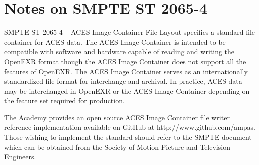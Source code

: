 \numberedformat
\chapter{Notes on SMPTE ST 2065-4}

SMPTE ST 2065-4 -- ACES Image Container File Layout specifies a standard file container for ACES data. The ACES Image Container is intended to be compatible with software and hardware capable of reading and writing the OpenEXR format though the ACES Image Container does not support all the features of OpenEXR. The ACES Image Container serves as an internationally standardized file format for interchange and archival. In practice, ACES data may be interchanged in OpenEXR or the ACES Image Container depending on the feature set required for production.

The Academy provides an open source ACES Image Container file writer reference implementation available on GitHub at http://www.github.com/ampas. Those wishing to implement the standard should refer to the SMPTE document which can be obtained from the Society of Motion Picture and Television Engineers.